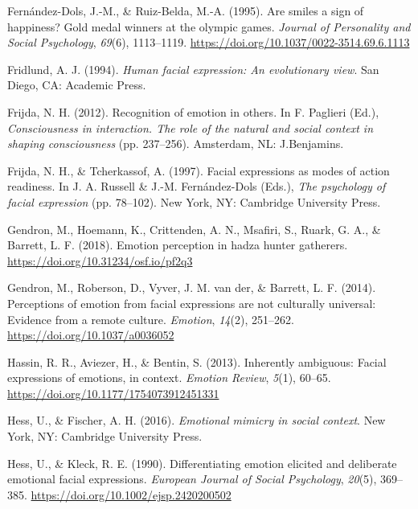 \documentclass[
  english,
  doc]{apa7}
\newlength{\cslhangindent}
\newenvironment{cslreferences}%
  {\setlength{\parindent}{0pt}%
  \everypar{\setlength{\hangindent}{\cslhangindent}}\ignorespaces}%
  {\par}
\begin{document}
\begin{cslreferences}
\leavevmode\hypertarget{ref-fernandez1995smiles}{}%
Fernández-Dols, J.-M., \& Ruiz-Belda, M.-A. (1995). Are smiles a sign of happiness? Gold medal winners at the olympic games. \emph{Journal of Personality and Social Psychology}, \emph{69}(6), 1113--1119. \url{https://doi.org/10.1037/0022-3514.69.6.1113}

\leavevmode\hypertarget{ref-fridlund1994human}{}%
Fridlund, A. J. (1994). \emph{Human facial expression: An evolutionary view}. San Diego, CA: Academic Press.

\leavevmode\hypertarget{ref-frijda2012recognition}{}%
Frijda, N. H. (2012). Recognition of emotion in others. In F. Paglieri (Ed.), \emph{Consciousness in interaction. The role of the natural and social context in shaping consciousness} (pp. 237--256). Amsterdam, NL: J.Benjamins.

\leavevmode\hypertarget{ref-frijda1997facial}{}%
Frijda, N. H., \& Tcherkassof, A. (1997). Facial expressions as modes of action readiness. In J. A. Russell \& J.-M. Fernández-Dols (Eds.), \emph{The psychology of facial expression} (pp. 78--102). New York, NY: Cambridge University Press.

\leavevmode\hypertarget{ref-gendron2018emotion}{}%
Gendron, M., Hoemann, K., Crittenden, A. N., Msafiri, S., Ruark, G. A., \& Barrett, L. F. (2018). Emotion perception in hadza hunter gatherers. \url{https://doi.org/10.31234/osf.io/pf2q3}

\leavevmode\hypertarget{ref-gendron2014perceptions}{}%
Gendron, M., Roberson, D., Vyver, J. M. van der, \& Barrett, L. F. (2014). Perceptions of emotion from facial expressions are not culturally universal: Evidence from a remote culture. \emph{Emotion}, \emph{14}(2), 251--262. \url{https://doi.org/10.1037/a0036052}

\leavevmode\hypertarget{ref-hassin2013inherently}{}%
Hassin, R. R., Aviezer, H., \& Bentin, S. (2013). Inherently ambiguous: Facial expressions of emotions, in context. \emph{Emotion Review}, \emph{5}(1), 60--65. \url{https://doi.org/10.1177/1754073912451331}

\leavevmode\hypertarget{ref-hess2016emotional}{}%
Hess, U., \& Fischer, A. H. (2016). \emph{Emotional mimicry in social context}. New York, NY: Cambridge University Press.

\leavevmode\hypertarget{ref-hess1990differentiating}{}%
Hess, U., \& Kleck, R. E. (1990). Differentiating emotion elicited and deliberate emotional facial expressions. \emph{European Journal of Social Psychology}, \emph{20}(5), 369--385. \url{https://doi.org/10.1002/ejsp.2420200502}


\end{cslreferences}
\end{document}
